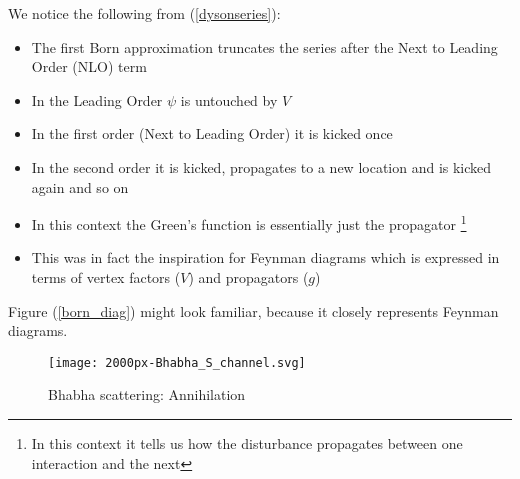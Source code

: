 We notice the following from (\ref{dysonseries}):
\begin{itemize}
\item The first Born approximation truncates the series after the Next to Leading Order (NLO) term
\item In the Leading Order $\psi$ is untouched by $V$
\item In the first order (Next to Leading Order) it is kicked once
\item In the second order it is kicked, propagates to a new location and is kicked again and so on
\item In this context the Green's function is essentially just the propagator \footnote{In this context it tells us how the disturbance propagates between one interaction and the next}
\item This was in fact the inspiration for Feynman diagrams which is expressed in terms of vertex factors ($V$) and propagators ($g$)
\end{itemize}
Figure (\ref{born_diag}) might look familiar, because it closely represents Feynman diagrams.
\begin{figure}[h]
	\centering
	\texttt{[image: 2000px-Bhabha\_S\_channel.svg]}
	\caption{Bhabha scattering: Annihilation}
\end{figure}